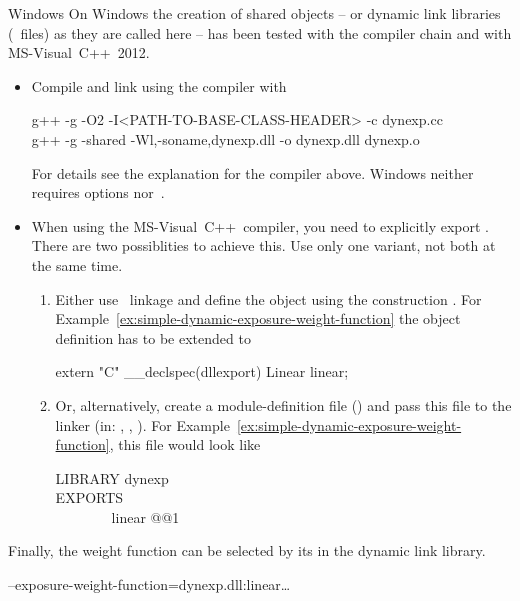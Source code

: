 \medskip

\begin{restrictedmaterial}{Windows}
  \noindent On Windows the creation of shared objects -- or dynamic
  link libraries (~files) as they are called here -- has
  been tested with the  compiler chain and with
  MS-Visual~C++~2012.

  \begin{itemize}
  \item
    Compile and link using the  compiler with
    \begin{literal}
      g++ -g -O2 -I<PATH-TO-BASE-CLASS-HEADER> -c dynexp.cc \\
      g++ -g -shared -Wl,-soname,dynexp.dll -o dynexp.dll dynexp.o
    \end{literal}
    For details see the explanation for the  compiler
    above.  Windows neither requires options 
    nor~.

  \item
    When using the MS-Visual~C++~compiler, you need to explicitly
    export .  There are two possiblities to achieve
    this.  Use only one variant, not both at the same time.

    \begin{enumerate}
    \item
      Either use ~linkage and define the object using the
      construction .  For
      Example~\ref{ex:simple-dynamic-exposure-weight-function} the
      object definition has to be extended to

      \begin{cxxlisting}
extern "C"
{
  __declspec(dllexport) Linear linear;
}
      \end{cxxlisting}

    \item
      Or, alternatively, create a module-definition file
      () and pass this file to the linker (in:
      , ,
      ).  For
      Example~\ref{ex:simple-dynamic-exposure-weight-function}, this
      file would look like
      \begin{literal}
        LIBRARY dynexp \\
        EXPORTS \\
        ~~~~~~~~linear @@1 \\
      \end{literal}
    \end{enumerate}
  \end{itemize}

  Finally, the weight function can be selected by its 
  in the dynamic link library.

  \begin{literal}
    \app{} --exposure-weight-function=dynexp.dll:linear\dots
  \end{literal}
\end{restrictedmaterial}

